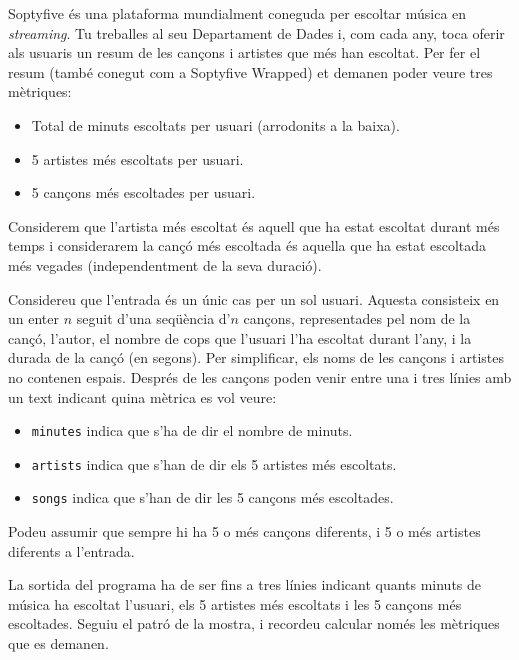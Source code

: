 

\Statement

Soptyfive és una plataforma mundialment coneguda per escoltar música en \emph{streaming}. Tu treballes al seu Departament de Dades i, com cada any, toca oferir als usuaris un resum de les cançons i artistes que més han escoltat. Per fer el resum (també conegut com a Soptyfive Wrapped) et demanen poder veure tres mètriques:

\begin{itemize}
    \item Total de minuts escoltats per usuari (arrodonits a la baixa).
    \item 5 artistes més escoltats per usuari.
    \item 5 cançons més escoltades per usuari.
\end{itemize}

Considerem que l'artista més escoltat és aquell que ha estat escoltat durant més temps i considerarem la cançó més escoltada és aquella que ha estat escoltada més vegades (independentment de la seva duració).

\Input

Considereu que l'entrada és un únic cas per un sol usuari. Aquesta consisteix en un enter $n$ seguit d'una seqüència d'$n$ cançons, representades pel nom de la cançó, l'autor, el nombre de cops que l'usuari l'ha escoltat durant l'any, i la durada de la cançó (en segons). Per simplificar, els noms de les cançons i artistes no contenen espais. Després de les cançons poden venir entre una i tres línies amb un text indicant quina mètrica es vol veure:

\begin{itemize}
    \item \texttt{minutes} indica que s'ha de dir el nombre de minuts.
    \item \texttt{artists} indica que s'han de dir els 5 artistes més escoltats.
    \item \texttt{songs} indica que s'han de dir les 5 cançons més escoltades.
\end{itemize}

Podeu assumir que sempre hi ha 5 o més cançons diferents, i 5 o més artistes diferents a l'entrada.

\Output

La sortida del programa ha de ser fins a tres línies indicant quants minuts de música ha escoltat l'usuari, els 5 artistes més escoltats i les 5 cançons més escoltades. Seguiu el patró de la mostra, i recordeu calcular només les mètriques que es demanen.

